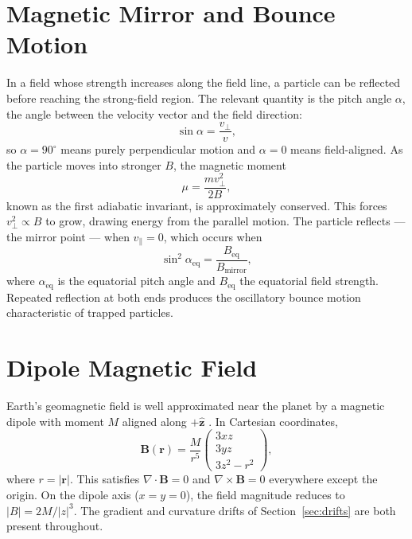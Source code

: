 \section{Magnetic Mirror and Bounce Motion}
\label{sec:mirror}

In a field whose strength increases along the field line, a particle can
be reflected before reaching the strong-field region. The relevant
quantity is the pitch angle $\alpha$, the angle between the velocity
vector and the field direction:
\begin{equation}
  \sin\alpha = \frac{v_\perp}{v},
  \label{eq:pitch}
\end{equation}
so $\alpha = 90^\circ$ means purely perpendicular motion and
$\alpha = 0$ means field-aligned. As the particle moves into stronger
$B$, the magnetic moment
\begin{equation}
  \mu = \frac{m v_\perp^2}{2B},
  \label{eq:mu}
\end{equation}
known as the first adiabatic invariant, is approximately conserved. This
forces $v_\perp^2 \propto B$ to grow, drawing energy from the parallel
motion. The particle reflects --- the mirror point --- when
$v_\parallel = 0$, which occurs when
\begin{equation}
  \sin^2\alpha_\mathrm{eq} = \frac{B_\mathrm{eq}}{B_\mathrm{mirror}},
  \label{eq:mirror}
\end{equation}
where $\alpha_\mathrm{eq}$ is the equatorial pitch angle and
$B_\mathrm{eq}$ the equatorial field strength. Repeated reflection at
both ends produces the oscillatory bounce motion characteristic of
trapped particles.

\section{Dipole Magnetic Field}
\label{sec:dipole}

Earth's geomagnetic field is well approximated near the planet by a
magnetic dipole with moment $M$ aligned along $+\hat{\mathbf{z}}$
\citep{jackson1999}. In Cartesian coordinates,
\begin{equation}
  \mathbf{B}(\mathbf{r}) = \frac{M}{r^5}
    \begin{pmatrix} 3xz \\ 3yz \\ 3z^2 - r^2 \end{pmatrix},
  \label{eq:dipole}
\end{equation}
where $r = |\mathbf{r}|$. This satisfies $\nabla \cdot \mathbf{B} = 0$
and $\nabla \times \mathbf{B} = 0$ everywhere except the origin. On
the dipole axis ($x = y = 0$), the field magnitude reduces to
$|B| = 2M/|z|^3$. The gradient and curvature drifts of
Section~\ref{sec:drifts} are both present throughout.

